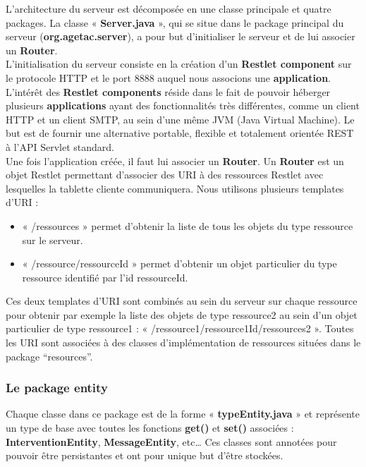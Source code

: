 \documentclass{article}
\begin{document}
L'architecture du serveur est décomposée en une classe principale et quatre packages.
La classe « \textbf{Server.java} », qui se situe dans le package principal du serveur (\textbf{org.agetac.server}), a pour but d'initialiser le serveur et de lui associer un \textbf{Router}.\\


L'initialisation du serveur consiste en la création d'un \textbf{Restlet component} sur le protocole HTTP et le port 8888 auquel nous associons une \textbf{application}. L'intérêt des \textbf{Restlet components} réside dans le fait de pouvoir héberger plusieurs \textbf{applications} ayant des fonctionnalités très différentes, comme un client HTTP et un client SMTP, au sein d'une même JVM (Java Virtual Machine). Le but est de fournir une alternative portable, flexible et totalement orientée REST à l'API Servlet standard.\\


Une fois l'application créée, il faut lui associer un \textbf{Router}. Un \textbf{Router} est un objet Restlet permettant d'associer des URI à des ressources Restlet avec lesquelles la tablette cliente communiquera. Nous utilisons plusieurs templates d'URI :
\begin{itemize}
\item « /ressources » permet d'obtenir la liste de tous les objets du type ressource sur le serveur.
\item « /ressource/{ressourceId} »     permet d'obtenir un objet particulier du type ressource identifié par l'id ressourceId.
\end{itemize}
Ces deux templates d'URI sont combinés au sein du serveur sur chaque ressource pour obtenir par exemple la liste des objets de type ressource2 au sein d'un objet particulier de type ressource1 : « /ressource1/{ressource1Id}/ressources2 ».
Toutes les URI sont associées à des classes d'implémentation de ressources situées dans le package “resources”.



\subsubsection{Le package entity}

Chaque classe dans ce package est de la forme « \textbf{typeEntity.java} » et représente un type de base avec toutes les fonctions \textbf{get()} et \textbf{set()} associées : \textbf{InterventionEntity}, \textbf{MessageEntity}, etc… Ces classes sont annotées pour pouvoir être persistantes et ont pour unique but d'être stockées.\\
\end{document}

